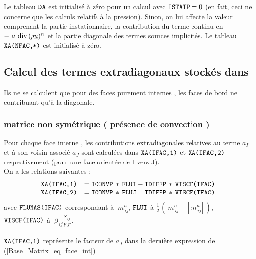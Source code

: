 Le tableau $\text{\texttt{DA}}$ est initialisé à zéro pour un calcul avec
$ \text{\texttt{ISTATP}} = 0 $ (en fait, ceci ne concerne que les calculs relatifs à la
pression). Sinon, on lui affecte la valeur  comprenant la partie instationnaire, la contribution du terme continu en $-\ a\ \text{div}\,(\rho \underline{u})^n$
et la partie diagonale des termes sources implicités. Le tableau
$\text{\texttt{XA(NFAC,*)}}$ est initialisé à zéro.\\
\subsection*{\bf Calcul des termes extradiagonaux stockés dans  }
Ils ne se calculent que pour des faces purement internes , les faces
de bord ne contribuant qu'à la diagonale.
\subsubsection*{matrice non symétrique ( présence de convection ) }
Pour chaque face interne , les contributions extradiagonales relatives
au terme $a_I$ et à son voisin  associé $a_J$ sont calculées dans
$\text{\texttt{XA(IFAC,1)}}$ et $\text{\texttt{XA(IFAC,2)}}$ respectivement (pour une face orientée
de I vers J).\\
On a les relations suivantes :\\
\begin{equation}\label{Base_Matrix_eq_extra}
\begin{array}{ll}
\text{\texttt{XA(IFAC,1)}}& = \text{\texttt{ICONVP}}\,*\,\text{\texttt{FLUI}} - \text{\texttt{IDIFFP}}\,*\,\text{\texttt{VISCF(IFAC)}}\\
\text{\texttt{XA(IFAC,2)}}& = \text{\texttt{ICONVP}}\,*\,\text{\texttt{FLUJ}} - \text{\texttt{IDIFFP}}\,*\,\text{\texttt{VISCF(IFAC)}}\\
\end{array}
\end{equation}
avec $\text{\texttt{FLUMAS(IFAC)}}$  correspondant à $\ m_{\,ij}^n$, $\text{\texttt{FLUI}}$ à $ \displaystyle\frac{1}{2}\,(\ m_{\,ij}^n - |\
m_{\,ij}^n|\ )$, $\text{\texttt{VISCF(IFAC)}} $ à $ \ \displaystyle \beta_{\,ij}\frac {
S_{\,ij}}{\overline{I'J'}} $.\\\\
$\text{\texttt{XA(IFAC,1)}}$ représente le facteur de $a_J$ dans la
dernière expression de (\ref{Base_Matrix_eq_face_int}).\\

